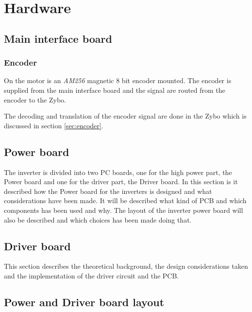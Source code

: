 \section{Hardware}
\label{sec:hardware}

\subsection{Main interface board}

\subsubsection{Encoder}

On the motor is an \textit{AM256} magnetic 8 bit encoder mounted. The encoder is supplied from the main interface board and the signal are routed from the encoder to the Zybo. 

The decoding and translation of the encoder signal are done in the Zybo which is discussed in section \ref{sec:encoder}.





\subsection{Power board}
The inverter is divided into two PC boards, one for the high power part, the Power board and one for the driver part, the Driver board. In this section is it described how the Power board for the inverters is designed and what considerations have been made. It will be described what kind of PCB and which components has been used and why. The layout of the inverter power board will also be described and which choices has been made doing that.

% 
% 

\subsection{Driver board}
This section describes the theoretical background, the design considerations taken and the implementation of the driver circuit and the PCB.



\subsection{Power and Driver board layout}
